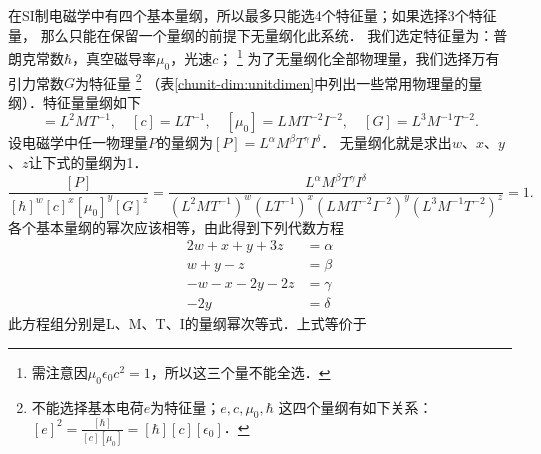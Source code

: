 在SI制电磁学中有四个基本量纲，所以最多只能选4个特征量；如果选择3个特征量，
那么只能在保留一个量纲的前提下无量纲化此系统．
我们选定特征量为：普朗克常数$\hbar$，真空磁导率$\mu_0$，光速$c$；
{\footnote{需注意因$\mu_0\epsilon_0 c^2 =1$，所以这三个量不能全选．}}
为了无量纲化全部物理量，我们选择万有引力常数$G$为特征量
{\footnote{不能选择基本电荷$e$为特征量；$e,c,\mu_0,\hbar$
这四个量纲有如下关系：
$[e]^2=\frac{[\hbar]}{[c][\mu_0]}=[\hbar][c][\epsilon_0]$．}}
（表\ref{chunit-dim:unitdimen}中列出一些常用物理量的量纲）．特征量量纲如下
\begin{equation*}
  [\hbar] = \si{L^{2}M^{}T^{-1}} , \quad  [c] = \si{LT^{-1}}, \quad
  [\mu_0] = \si{L^{}M^{}T^{-2}I^{-2}}, \quad  [G] = \si{L^{3}M^{-1}T^{-2}}.
\end{equation*}
设电磁学中任一物理量$P$的量纲为$[P]=\si{L}^\alpha \si{M}^\beta \si{T}^\gamma \si{I}^\delta$．
无量纲化就是求出$w$、$x$、$y$、$z$让下式的量纲为1．
\setlength{\mathindent}{0em}
\begin{equation}\label{chunit-dim:eqn_dimensionless-0}
  \frac{[P]}{[\hbar]^w[c]^x[\mu_0]^y[G]^z} =
   \frac{ \si{L}^\alpha \si{M}^\beta \si{T}^\gamma \si{I}^\delta }
  {(\si{L^{2}M^{}T^{-1}} )^w (\si{LT^{-1}})^x
  (\si{L^{}M^{}T^{-2}I^{-2}})^y (\si{L^{3}M^{-1}T^{-2}})^z}  =1 .
\end{equation}\setlength{\mathindent}{2em}
各个基本量纲的幂次应该相等，由此得到下列代数方程
\begin{equation}
\begin{aligned}
  2w+x+y+3z &= \alpha \\
  w+y-z &= \beta \\
  -w-x-2y-2z &= \gamma \\
  -2y &= \delta
\end{aligned}
\end{equation}
此方程组分别是\si{L}、\si{M}、\si{T}、\si{I}的量纲幂次等式．上式等价于
